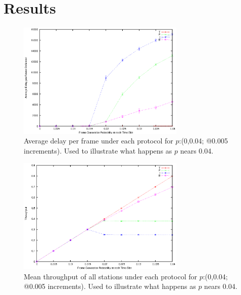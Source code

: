 \documentclass[twocolumn]{article}
\begin{document}



\section*{Results}

\begin{figure}
    \centering \includegraphics[width=8cm]{plots/delay_big.eps}
    \caption{\footnotesize  Average delay per frame under each protocol for
    $p$:(0,0.04; @0.005 increments). Used to illustrate what happens as $p$
    nears 0.04.} \label{fig:delay_big}
\end{figure}

\begin{figure}
    \centering \includegraphics[width=8cm]{plots/throughput_big.eps}
    \caption{\footnotesize Mean throughput of all stations under each protocol
    for $p$:(0,0.04; @0.005 increments). Used to illustrate what happens as $p$
    nears 0.04.} \label{fig:throughput_big}
\end{figure}
\end{document}

